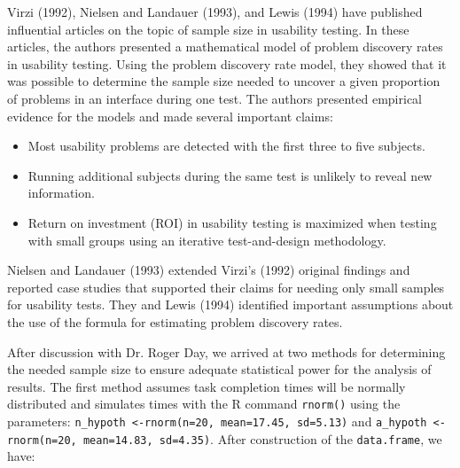 \documentclass[11pt]{article}
\begin{document}
Virzi (1992), Nielsen and Landauer (1993), and Lewis (1994) have published influential articles on the topic of sample size in usability testing. In these articles, the authors presented a mathematical model of problem discovery rates in usability testing. Using the problem discovery rate model, they showed that it was possible to determine the sample size needed to uncover a given proportion of problems in an interface during one test. The authors presented empirical evidence for the models and made several important claims:
\begin{itemize}
\item{Most usability problems are detected with the first three to five subjects.}
\item{Running additional subjects during the same test is unlikely to reveal new information.}
\item{Return on investment (ROI) in usability testing is maximized when testing with small groups using an iterative test-and-design methodology.}
\end{itemize}
Nielsen and Landauer (1993) extended Virzi’s (1992) original findings and reported case studies that supported their claims for needing only small samples for usability tests. They and Lewis (1994) identified important assumptions about the use of the formula for estimating problem discovery rates.

After discussion with Dr. Roger Day, we arrived at two methods for determining the needed sample size to ensure adequate statistical power for the analysis of results. The first method assumes task completion times will be normally distributed and simulates times with the \textsf{R} command \texttt{rnorm()} using the parameters: \texttt{n\_hypoth <-rnorm(n=20, mean=17.45, sd=5.13)} and \texttt{a\_hypoth <- rnorm(n=20, mean=14.83, sd=4.35)}. After construction of the \texttt{data.frame}, we have:
\end{document}
